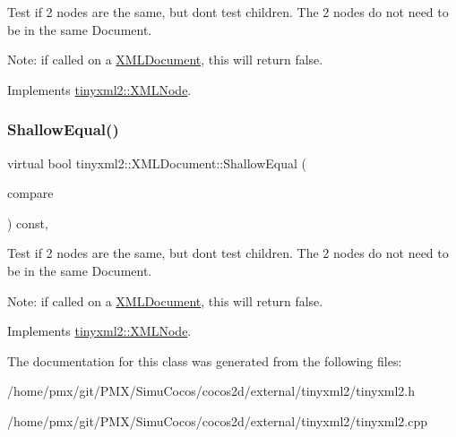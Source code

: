 Test if 2 nodes are the same, but don\textquotesingle{}t test children. The 2 nodes do not need to be in the same Document.

Note\+: if called on a \hyperlink{classtinyxml2_1_1XMLDocument}{X\+M\+L\+Document}, this will return false. 

Implements \hyperlink{classtinyxml2_1_1XMLNode_a7ce18b751c3ea09eac292dca264f9226}{tinyxml2\+::\+X\+M\+L\+Node}.

\mbox{\label{classtinyxml2_1_1XMLDocument_a6fe5ef18699091844fcf64b56ffa5bf9}} 
\subsubsection{\texorpdfstring{Shallow\+Equal()}{ShallowEqual()}\hspace{0.1cm}{\footnotesize\ttfamily [2/2]}}
{\footnotesize\ttfamily virtual bool tinyxml2\+::\+X\+M\+L\+Document\+::\+Shallow\+Equal (\begin{DoxyParamCaption}\item[{const \hyperlink{classtinyxml2_1_1XMLNode}{X\+M\+L\+Node} $\ast$}]{compare }\end{DoxyParamCaption}) const\hspace{0.3cm}{\ttfamily [inline]}, {\ttfamily [virtual]}}

Test if 2 nodes are the same, but don\textquotesingle{}t test children. The 2 nodes do not need to be in the same Document.

Note\+: if called on a \hyperlink{classtinyxml2_1_1XMLDocument}{X\+M\+L\+Document}, this will return false. 

Implements \hyperlink{classtinyxml2_1_1XMLNode_a7ce18b751c3ea09eac292dca264f9226}{tinyxml2\+::\+X\+M\+L\+Node}.



The documentation for this class was generated from the following files\+:\begin{DoxyCompactItemize}
\item 
/home/pmx/git/\+P\+M\+X/\+Simu\+Cocos/cocos2d/external/tinyxml2/tinyxml2.\+h\item 
/home/pmx/git/\+P\+M\+X/\+Simu\+Cocos/cocos2d/external/tinyxml2/tinyxml2.\+cpp\end{DoxyCompactItemize}
